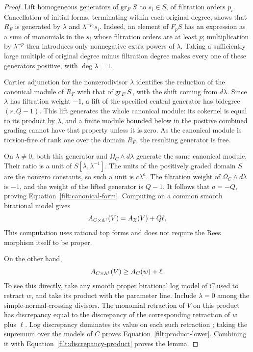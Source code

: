 \begin{proof}
Lift homogeneous generators of $\operatorname{gr}_F S$ to $s_i\in S$, of filtration
orders $p_i$.  Cancellation of initial forms, terminating within each
original degree, shows that $R_F$ is generated by $\lambda$ and
$\lambda^{-p_i}s_i$.  Indeed, an element of $F_pS$ has an expression as
a sum of monomials in the $s_i$ whose filtration orders are at least $p$;
multiplication by $\lambda^{-p}$ then introduces only nonnegative extra
powers of $\lambda$.  Taking a sufficiently large multiple of original
degree minus filtration degree makes every one of these generators
positive, with $\deg\lambda=1$.

Cartier adjunction \cite[Tag~0B4A]{StacksProject} for the nonzerodivisor
$\lambda$ identifies the reduction of
the canonical module of $R_F$ with that of $\operatorname{gr}_FS$, with the shift
coming from $d\lambda$.  Since $\lambda$ has filtration weight $-1$, a
lift of the specified central generator has bidegree $(r,Q-1)$.
This lift generates the whole canonical module: its cokernel is equal
to its product by $\lambda$, and a finite module bounded below in the
positive combined grading cannot have that property unless it is zero.
As the canonical module is torsion-free of rank one over the domain
$R_F$, the resulting generator is free.

On $\lambda\ne0$, both this generator and
$\Omega_C\wedge d\lambda$ generate the same canonical module.  Their
ratio is a unit of $S[\lambda,\lambda^{-1}]$.  The units of the
positively graded domain $S$ are the nonzero constants, so such a unit
is $c\lambda^a$.  The filtration weight of
$\Omega_C\wedge d\lambda$ is $-1$, and the weight of the lifted generator
is $Q-1$.  It follows that $a=-Q$, proving
Equation~\eqref{filt:canonical-form}.  Computing on a common smooth
birational model gives
\begin{equation}\label{filt:discrepancy-product}
 A_{C\times\mathbb A^1}(V)
   =A_{\mathfrak X}(V)+Q\ell.
\end{equation}
This computation uses rational top forms and does not require the
Rees morphism itself to be proper.

On the other hand,
\begin{equation}\label{filt:product-lower}
 A_{C\times\mathbb A^1}(V)\geq A_C(w)+\ell.
\end{equation}
To see this directly, take any smooth proper birational log model of
$C$ used to retract $w$, and take its product with the parameter line.
Include $\lambda=0$ among the simple-normal-crossing divisors.  The
monomial retraction of $V$ on this product has discrepancy equal to the
discrepancy of the corresponding retraction of $w$ plus $\ell$.
Log discrepancy dominates its value on each such retraction
\cite[Corollary~5.4 and Remark~5.6]{JM12}; taking
the supremum over the models of $C$ proves
Equation~\eqref{filt:product-lower}.  Combining it with
Equation~\eqref{filt:discrepancy-product} proves the lemma.
\end{proof}

